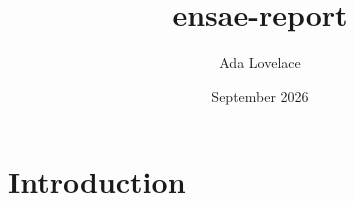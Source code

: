 \documentclass{article}
\title{ensae-report}
\author{Ada Lovelace}
\date{September 2026}
\begin{document}
\maketitle

\section{Introduction}
\end{document}
